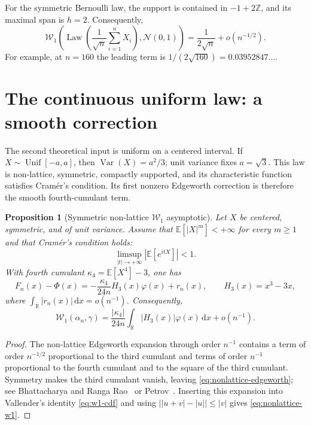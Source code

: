 \documentclass[11pt]{article}
\newtheorem{proposition}[theorem]{Proposition}
\theoremstyle{remark}
\newcommand{\R}{\mathbb{R}}
\newcommand{\E}{\mathbb{E}}
\newcommand{\Wass}{\mathcal{W}}
\newcommand{\dd}{\,\mathrm{d}}
\newcommand{\abs}[1]{\left\lvert #1\right\rvert}
\newcommand{\Law}{\operatorname{Law}}
\newcommand{\Unif}{\operatorname{Unif}}
\begin{document}
For the symmetric Bernoulli law, the support is contained in
$-1+2\mathbb Z$, and its maximal span is $h=2$. Consequently,
\begin{equation}\label{eq:bernoulli-final}
  \boxed{
  \Wass_1\!\left(
    \Law\!\left(\frac1{\sqrt n}\sum_{i=1}^nX_i\right),
    \mathcal N(0,1)
  \right)
  =\frac1{2\sqrt n}+o(n^{-1/2}).}
\end{equation}
For example, at $n=160$ the leading term is
$1/(2\sqrt{160})=0.03952847\ldots$.

\section{The continuous uniform law: a smooth correction}

The second theoretical input is uniform on a centered interval. If
$X\sim\Unif[-a,a]$, then $\operatorname{Var}(X)=a^2/3$; unit variance fixes
$a=\sqrt3$. This law is non-lattice, symmetric, compactly supported, and its
characteristic function satisfies Cram\'er's condition. Its first nonzero
Edgeworth correction is therefore the smooth fourth-cumulant term.

\begin{proposition}[Symmetric non-lattice $\mathcal W_1$ asymptotic]
\label{prop:nonlattice-w1}
Let $X$ be centered, symmetric, and of unit variance. Assume that
$\E[\abs{X}^m]<+\infty$ for every $m\geq1$ and that Cram\'er's condition holds:
\begin{equation}\label{eq:cramer-condition}
  \limsup_{\abs{t}\to+\infty}\abs{\E[e^{itX}]}<1.
\end{equation}
With fourth cumulant
$\kappa_4=\E[X^4]-3$, one has
\begin{equation}\label{eq:nonlattice-edgeworth}
  F_n(x)-\Phi(x)
  =-\frac{\kappa_4}{24n}H_3(x)\varphi(x)+r_n(x),
  \qquad
  H_3(x)=x^3-3x,
\end{equation}
where $\int_\R\abs{r_n(x)}\dd x=o(n^{-1})$. Consequently,
\begin{equation}\label{eq:nonlattice-w1}
  \Wass_1(\alpha_n,\gamma)
  =\frac{\abs{\kappa_4}}{24n}
  \int_{\R}\abs{H_3(x)}\varphi(x)\dd x
  +o(n^{-1}).
\end{equation}
\end{proposition}

\begin{proof}
The non-lattice Edgeworth expansion through order $n^{-1}$ contains a term
of order $n^{-1/2}$ proportional to the third cumulant and terms of order
$n^{-1}$ proportional to the fourth cumulant and to the square of the third
cumulant. Symmetry makes the third cumulant vanish, leaving
\eqref{eq:nonlattice-edgeworth}; see
Bhattacharya and Ranga Rao~\cite[Chapter~4]{BhattacharyaRao2010} or
Petrov~\cite[Chapter~VI]{Petrov1975}. Inserting this expansion into
Vallender's identity \eqref{eq:w1-cdf} and using
$\bigl|\abs{u+v}-\abs u\bigr|\leq\abs v$ gives
\eqref{eq:nonlattice-w1}.
\end{proof}
\end{document}
